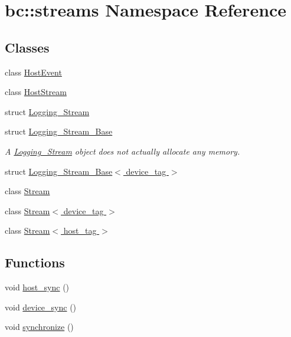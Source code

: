 \hypertarget{namespacebc_1_1streams}{}\section{bc\+:\+:streams Namespace Reference}
\label{namespacebc_1_1streams}
\subsection*{Classes}
\begin{DoxyCompactItemize}
\item 
class \hyperlink{classbc_1_1streams_1_1HostEvent}{Host\+Event}
\item 
class \hyperlink{classbc_1_1streams_1_1HostStream}{Host\+Stream}
\item 
struct \hyperlink{structbc_1_1streams_1_1Logging__Stream}{Logging\+\_\+\+Stream}
\item 
struct \hyperlink{structbc_1_1streams_1_1Logging__Stream__Base}{Logging\+\_\+\+Stream\+\_\+\+Base}
\begin{DoxyCompactList}\small\item\em A \hyperlink{structbc_1_1streams_1_1Logging__Stream}{Logging\+\_\+\+Stream} object does not actually allocate any memory. \end{DoxyCompactList}\item 
struct \hyperlink{structbc_1_1streams_1_1Logging__Stream__Base_3_01device__tag_01_4}{Logging\+\_\+\+Stream\+\_\+\+Base$<$ device\+\_\+tag $>$}
\item 
class \hyperlink{classbc_1_1streams_1_1Stream}{Stream}
\item 
class \hyperlink{classbc_1_1streams_1_1Stream_3_01device__tag_01_4}{Stream$<$ device\+\_\+tag $>$}
\item 
class \hyperlink{classbc_1_1streams_1_1Stream_3_01host__tag_01_4}{Stream$<$ host\+\_\+tag $>$}
\end{DoxyCompactItemize}
\subsection*{Functions}
\begin{DoxyCompactItemize}
\item 
void \hyperlink{namespacebc_1_1streams_a83bc11f49b9ce1547ccc691044d1c442}{host\+\_\+sync} ()
\item 
void \hyperlink{namespacebc_1_1streams_a5f055a964240defc7cf27f6ac1865e49}{device\+\_\+sync} ()
\item 
void \hyperlink{namespacebc_1_1streams_acbeb4b80cb63cda4c917f38eb4f870ae}{synchronize} ()
\end{DoxyCompactItemize}


